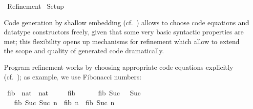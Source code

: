 %
\begin{isabellebody}%
\def\isabellecontext{Refinement}%
%
\isadelimtheory
%
\endisadelimtheory
%
\isatagtheory
{}\isamarkupfalse%
\ Refinement\isanewline
{}\ Setup\isanewline
{}%
\endisatagtheory
{\isafoldtheory}%
%
\isadelimtheory
%
\endisadelimtheory
%
\isamarkuptrue%
%
\begin{isamarkuptext}%
Code generation by shallow embedding (cf.~)
  allows to choose code equations and datatype constructors freely,
  given that some very basic syntactic properties are met; this
  flexibility opens up mechanisms for refinement which allow to extend
  the scope and quality of generated code dramatically.%
\end{isamarkuptext}%
\isamarkuptrue%
%
\isamarkuptrue%
%
\begin{isamarkuptext}%
Program refinement works by choosing appropriate code equations
  explicitly (cf.~); as example, we use Fibonacci
  numbers:%
\end{isamarkuptext}%
\isamarkuptrue%
%
\isadelimquote
%
\endisadelimquote
%
\isatagquote
{}\isamarkupfalse%
\ fib\ {}{}\ {}nat\ {}\ nat{}\ \isanewline
\ \ \ \ {}fib\ {}\ {}\ {}{}\isanewline
\ \ {}\ {}fib\ {}Suc\ {}{}\ {}\ Suc\ {}{}\isanewline
\ \ {}\ {}fib\ {}Suc\ {}Suc\ n{}{}\ {}\ fib\ n\ {}\ fib\ {}Suc\ n{}{}%
\endisatagquote
{\isafoldquote}%
%
\isadelimquote
%
\endisadelimquote
%
\begin{isamarkuptext}%

\end{isamarkuptext}
\end{isabellebody}
